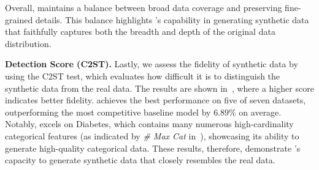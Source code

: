 Overall, \method maintains a balance between broad data coverage and preserving fine-grained details. This balance highlights \method’s capability in generating synthetic data that faithfully captures both the breadth and depth of the original data distribution.

\textbf{Detection Score (C2ST).} Lastly, we assess the fidelity of synthetic data by using the C2ST test, which evaluates how difficult it is to distinguish the synthetic data from the real data. The results are shown in~, where a higher score indicates better fidelity. \method achieves the best performance on five of seven datasets, outperforming the most competitive baseline model by $6.89\%$ on average. Notably, \method excels on Diabetes, which contains many numerous high-cardinality categorical features (as indicated by \emph{\# Max Cat} in~), showcasing its ability to generate high-quality categorical data. These results, therefore, demonstrate \method's capacity to generate synthetic data that closely resembles the real data.

